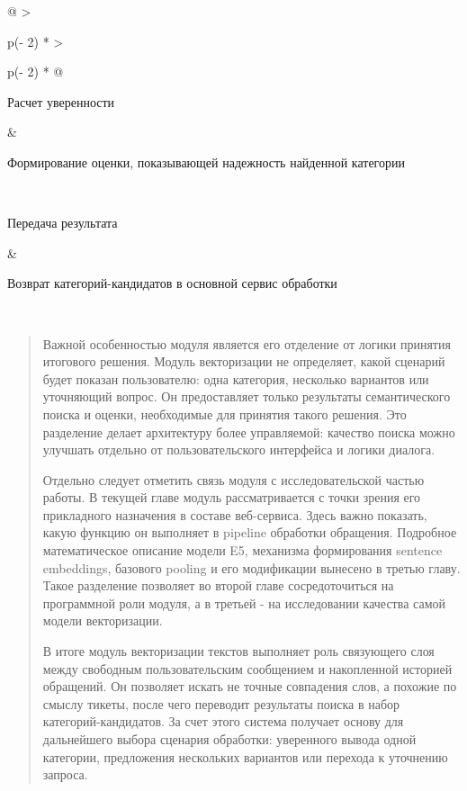 \documentclass[
]{article}
\begin{document}
\begin{longtable}[]{@{}
  >{\raggedright\arraybackslash}p{(\columnwidth - 2\tabcolsep) * }
  >{\raggedright\arraybackslash}p{(\columnwidth - 2\tabcolsep) * }@{}}
\begin{minipage}[b]{\linewidth}\raggedright
Расчет уверенности
\end{minipage} & \begin{minipage}[b]{\linewidth}\raggedright
Формирование оценки, показывающей надежность найденной категории
\end{minipage} \\
\begin{minipage}[b]{\linewidth}\raggedright
Передача результата
\end{minipage} & \begin{minipage}[b]{\linewidth}\raggedright
Возврат категорий-кандидатов в основной сервис обработки
\end{minipage} \\
\midrule\noalign{}
\endhead
\bottomrule\noalign{}
\endlastfoot
\end{longtable}

\begin{quote}
Важной особенностью модуля является его отделение от логики принятия
итогового решения. Модуль векторизации не определяет, какой сценарий
будет показан пользователю: одна категория, несколько вариантов или
уточняющий вопрос. Он предоставляет только результаты семантического
поиска и оценки, необходимые для принятия такого решения. Это разделение
делает архитектуру более управляемой: качество поиска можно улучшать
отдельно от пользовательского интерфейса и логики диалога.

Отдельно следует отметить связь модуля с исследовательской частью
работы. В текущей главе модуль рассматривается с точки зрения его
прикладного назначения в составе веб-сервиса. Здесь важно показать,
какую функцию он выполняет в pipeline обработки обращения. Подробное
математическое описание модели E5, механизма формирования sentence
embeddings, базового pooling и его модификации вынесено в третью главу.
Такое разделение позволяет во второй главе сосредоточиться на
программной роли модуля, а в третьей - на исследовании качества самой
модели векторизации.

В итоге модуль векторизации текстов выполняет роль связующего слоя между
свободным пользовательским сообщением и накопленной историей обращений.
Он позволяет искать не точные совпадения слов, а похожие по смыслу
тикеты, после чего переводит результаты поиска в набор
категорий-кандидатов. За счет этого система получает основу для
дальнейшего выбора сценария обработки: уверенного вывода одной
категории, предложения нескольких вариантов или перехода к уточнению
запроса.
\end{quote}
\end{document}
